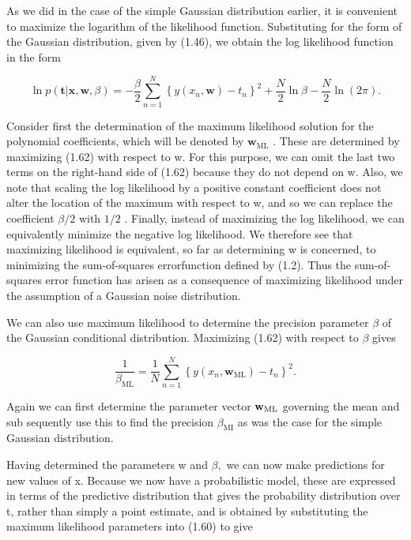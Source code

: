 \documentclass[
  10
]{article}
\begin{document}
As we did in the case of the simple Gaussian distribution earlier, it is
convenient to maximize the logarithm of the likelihood function.
Substituting for the form of the Gaussian distribution, given by (1.46),
we obtain the log likelihood function in the form

\[
\ln p (\mathbf {t} | \mathbf {x}, \mathbf {w}, \beta) = - \frac {\beta}{2} \sum_ {n = 1} ^ {N} \left\{y (x _ {n}, \mathbf {w}) - t _ {n} \right\} ^ {2} + \frac {N}{2} \ln \beta - \frac {N}{2} \ln (2 \pi).\tag{1.62}
\]

Consider first the determination of the maximum likelihood solution for
the polynomial coefficients, which will be denoted by
\(\mathbf { w } _ { \mathrm { M L } }\) . These are determined by
maximizing (1.62) with respect to w. For this purpose, we can omit the
last two terms on the right-hand side of (1.62) because they do not
depend on w. Also, we note that scaling the log likelihood by a positive
constant coefficient does not alter the location of the maximum with
respect to w, and so we can replace the coefficient \(\beta / 2\) with
\(1 / 2\) . Finally, instead of maximizing the log likelihood, we can
equivalently minimize the negative log likelihood. We therefore see that
maximizing likelihood is equivalent, so far as determining w is
concerned, to minimizing the sum-of-squares errorfunction defined by
(1.2). Thus the sum-of-squares error function has arisen as a
consequence of maximizing likelihood under the assumption of a Gaussian
noise distribution.

We can also use maximum likelihood to determine the precision parameter
\(\beta\) of the Gaussian conditional distribution. Maximizing (1.62)
with respect to \(\beta\) gives

\[
\frac {1}{\beta_ {\mathrm{ML}}} = \frac {1}{N} \sum_ {n = 1} ^ {N} \left\{y (x _ {n}, \mathbf {w} _ {\mathrm{ML}}) - t _ {n} \right\} ^ {2}.\tag{1.63}
\]

Again we can first determine the parameter vector
\({ \bf w } _ { \mathrm { M L } }\) governing the mean and sub sequently
use this to find the precision \(\beta _ { \mathrm { M I } }\) as was
the case for the simple Gaussian distribution.

Having determined the parameters w and \(\beta ,\) we can now make
predictions for new values of x. Because we now have a probabilistic
model, these are expressed in terms of the predictive distribution that
gives the probability distribution over t, rather than simply a point
estimate, and is obtained by substituting the maximum likelihood
parameters into (1.60) to give
\end{document}
